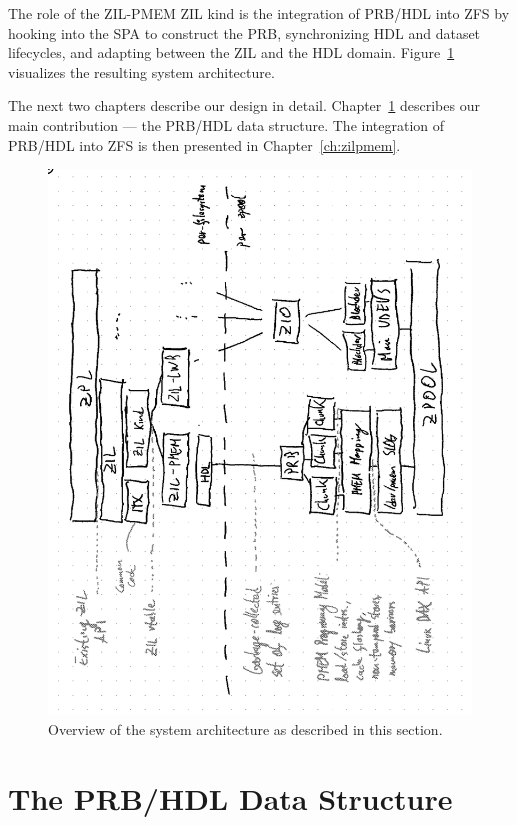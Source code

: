 \documentclass[12pt,a4paper,twoside]{book}
\begin{document}
{The role of the ZIL-PMEM ZIL kind is the integration of PRB/HDL into ZFS by
hooking into the SPA to construct the PRB,
synchronizing HDL and dataset lifecycles, and
adapting between the ZIL and the HDL domain.
Figure~\ref{fig:zilpmem_architecture} visualizes the resulting system architecture.

The next two chapters describe our design in detail.
Chapter~\ref{ch:prbhdl} describes our main contribution --- the PRB/HDL data structure.
The integration of PRB/HDL into ZFS is then presented in Chapter~\ref{ch:zilpmem}.

\begin{figure}[H]
    \includegraphics{fig/zilpmem_architecture_overview}
    \caption{Overview of the system architecture as described in this section.}
    \label{fig:zilpmem_architecture}
\end{figure}

\chapter{The PRB/HDL Data Structure}\label{ch:prbhdl}

}
\end{document}

